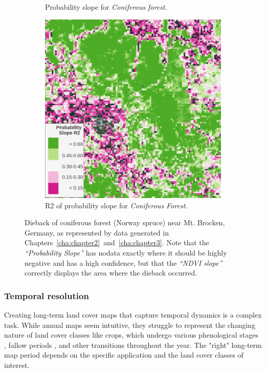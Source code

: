 \begin{figure}[H]
\begin{subfigure}[t]{0.24\textwidth}
        \caption{Probability slope for \textit{Coniferous forest}.}
        \label{fig:brocken_pslope}
        \end{subfigure}
        \hfill
        \begin{subfigure}[t]{0.24\textwidth}
        \centering
        \includegraphics[width=\linewidth,height=\linewidth]{figs_06/brocken_pslope_r2.png}
        \caption{R2 of probability slope for \textit{Coniferous Forest}.}
        \label{fig:brocken_pslope_r2}
        \end{subfigure}
        \caption{Dieback of coniferous forest (Norway spruce) near Mt. Brocken, Germany, as represented by data generated in Chapters\@~\ref{cha:chapter2}\@~and\@~\ref{cha:chapter3}. Note that the \textit{``Probability Slope''} has nodata exactly where it should be highly negative and has a high confidence, but that the \textit{``NDVI slope''} correctly displays the area where the dieback occurred.}
        \label{fig:brocken_slope_analysis}
        \end{figure}

        \subsubsection{Temporal resolution}

        Creating long-term land cover maps that capture temporal dynamics is a complex task. While annual maps seem intuitive, they struggle to represent the changing nature of land cover classes like crops, which undergo various phenological stages \citep{russwurm2023end}, fallow periods \citep{tong2020forgotten}, and other transitions \citep{rodriguez2024classification} throughout the year. The "right" long-term map period depends on the specific application and the land cover classes of interest. 
        
